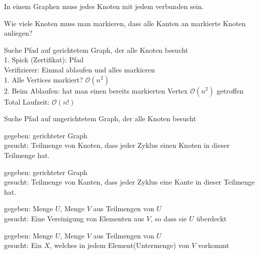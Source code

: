 \documentclass[a4paper]{article}
\begin{document}
\begin{multicols}{2}
	\begin{fspec}[CLIQUE]
	In einem Graphen muss jedes Knoten mit jedem verbunden sein.
	\end{fspec}
	
	\begin{fspec}
	Wie viele Knoten muss man markieren, dass alle Kanten an markierte Knoten anliegen?
	\end{fspec}
	
	\begin{fspec}
	Suche Pfad auf gerichtetem Graph, der alle Knoten besucht \\
	1. Spick (Zertifikat): Pfad \\
	Verifizierer: Einmal ablaufen und alles markieren \\
		1. Alle Vertices markiert? $\mathcal{O}(n^2)$ \\
		2. Beim Ablaufen: hat man einen bereits markierten Vertex $\mathcal{O}(n^2)$ getroffen \\
		Total Laufzeit: $\mathcal{O}(n!)$
	\end{fspec}
	
	\begin{fspec}
	Suche Pfad auf ungerichtetem Graph, der alle Knoten besucht
	\end{fspec}
	
	\begin{fspec}
	gegeben: gerichteter Graph \\
	gesucht: Teilmenge von Knoten, dass jeder Zyklus einen Knoten in dieser Teilmenge hat.
	\end{fspec}
	
	\begin{fspec}
	gegeben: gerichteter Graph \\
	gesucht: Teilmenge von Kanten, dass jeder Zyklus eine Kante in dieser Teilmenge hat.
	\end{fspec}	
	
	\begin{fspec}	
	gegeben: Menge $U$, Menge $V$ aus Teilmengen von $U$ \\
	gesucht: Eine Vereinigung von Elementen aus $V$, so dass sie $U$ überdeckt
	\end{fspec}
	
	\begin{fspec}	
	gegeben: Menge $U$, Menge $V$ aus Teilmengen von $U$  \\
	gesucht: Ein $X$, welches in jedem Element(Untermenge) von $V$ vorkommt
	\end{fspec}	
	

\end{multicols}
\end{document}
